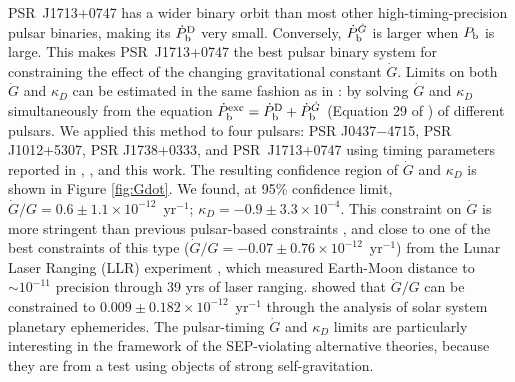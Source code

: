 PSR~J1713+0747 has a wider binary orbit than most other
high-timing-precision pulsar binaries, making its $\dot{P}_{\rm b}^{\rm D}$
very small. Conversely, $\dot{P}_{\rm b}^{\dot{G}}$ is larger when $P_{\rm b}$
is large. This makes PSR~J1713+0747 the best pulsar binary system for constraining
the effect of the changing gravitational constant $\dot{G}$. Limits 
on both $\dot{G}$ and $\kappa_D$ can be estimated in the same fashion as in
\citet{lwj+09}: by solving $\dot{G}$ and $\kappa_D$ simultaneously 
from the equation $\dot{P}_{\rm b}^{\rm exc} = \dot{P}_{\rm b}^{\rm D} +
\dot{P}_{\rm b}^{\dot{G}}$ (Equation 29 of \citealt{lwj+09}) of different
pulsars. We applied this method to four pulsars: PSR J0437$-$4715, PSR J1012+5307, PSR
J1738+0333, and PSR~J1713+0747 using timing parameters reported in
\citet{lwj+09}, \citet{fwe+12}, and this work.
The resulting confidence region of $\dot{G}$ and $\kappa_D$ is shown in Figure
\ref{fig:Gdot}.
We found, at 95\% confidence limit, $\dot{G}/G =
0.6\pm1.1\times10^{-12}$~yr$^{-1}$; $\kappa_D=-0.9\pm3.3\times10^{-4}$. 
This constraint on $\dot{G}$ is more stringent than
previous pulsar-based constraints \citep{fwe+12},
and close to one of the best constraints of this type
($\dot{G}/G=-0.07\pm0.76\times10^{-12}$~yr$^{-1}$) from the Lunar Laser Ranging
(LLR)
experiment \citep{hmb10}, which measured Earth-Moon distance to $\sim10^{-11}$
precision through 39 yrs of laser ranging.
\citet{fle+14} showed that $\dot{G}/G$ can be constrained to 
$0.009\pm0.182\times10^{-12}$~yr$^{-1}$ through the analysis of solar system planetary ephemerides.
The pulsar-timing $\dot{G}$ and $\kappa_D$ limits are particularly interesting 
in the framework of the SEP-violating alternative theories, because they are from 
a test using objects of strong self-gravitation.

